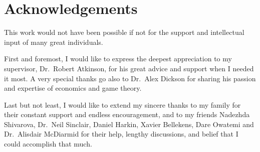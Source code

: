 \chapter*{Acknowledgements} %
\label{cha:acknowledgements}

This work would not have been possible if not for the support and intellectual input of many great individuals.

First and foremost, I would like to express the deepest appreciation to my supervisor, Dr.~Robert Atkinson, for his great advice and support when I needed it most. A very special thanks go also to Dr.~Alex Dickson for sharing his passion and expertise of economics and game theory.

Last but not least, I would like to extend my sincere thanks to my family for their constant support and endless encouragement, and to my friends Nadezhda Shivarova, Dr.~Neil Sinclair, Daniel Harkin, Xavier Bellekens, Dare Owatemi and Dr.~Alisdair McDiarmid for their help, lengthy discussions, and belief that I could accomplish that much.

